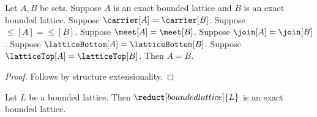 \begin{theorem}\label{exact_bounded_lattice_extensionality}
    Let $A,B$ be sets.
    Suppose $A$ is an exact bounded lattice and
        $B$ is an exact bounded lattice.
    Suppose $\carrier[A]=\carrier[B]$.
    Suppose $\leq[A]=\leq[B]$.
    Suppose $\meet[A]=\meet[B]$.
    Suppose $\join[A]=\join[B]$.
    Suppose $\latticeBottom[A]=\latticeBottom[B]$.
    Suppose $\latticeTop[A]=\latticeTop[B]$.
    Then $A=B$.
\end{theorem}
\begin{proof}
    Follows by structure extensionality.
\end{proof}

\begin{theorem}
    \label{bounded_lattice_reduct_is_exact_bounded_lattice}
    Let $L$ be a bounded lattice.
    Then $\reduct[bounded lattice]{L}$ is an exact bounded lattice.
\end{theorem}
